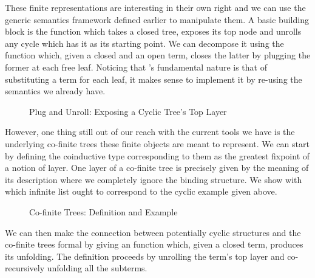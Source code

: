 These finite representations are interesting in their own right
and we can use the generic semantics framework defined earlier
to manipulate them. A basic building block is the 
function which takes a closed tree, exposes its top node and
unrolls any cycle which has it as its starting point. We can
decompose it using the  function which, given a closed
and an open term, closes the latter by plugging the former at
each free  leaf. Noticing that 's fundamental nature
is that of substituting a term for each leaf, it makes sense to
implement it by re-using the  semantics we already have.

\begin{figure}[h]
\begin{minipage}{0.52\textwidth}
\end{minipage}\hspace{2em}
\begin{minipage}{0.43\textwidth}
\end{minipage}
\caption{Plug and Unroll: Exposing a Cyclic Tree's Top Layer}
\end{figure}

However, one thing still out of our reach with the current tools we have
is the underlying co-finite trees these finite objects are meant
to represent. We can start by defining the coinductive type
corresponding to them as the greatest fixpoint of a notion of
layer. One layer of a co-finite tree is precisely given by the
meaning of its description where we completely ignore the binding
structure. We show with  which infinite list ought to
correspond to the cyclic example  given above.

\begin{figure}[h]
\begin{minipage}{0.55\textwidth}
\end{minipage}\hspace{2em}
\begin{minipage}{0.35\textwidth}
\end{minipage}
\caption{Co-finite Trees: Definition and Example}
\end{figure}

We can then make the connection between potentially cyclic
structures and the co-finite trees formal by giving an 
function which, given a closed term, produces its unfolding.
The definition proceeds by unrolling the term's top layer and
co-recursively unfolding all the subterms.

